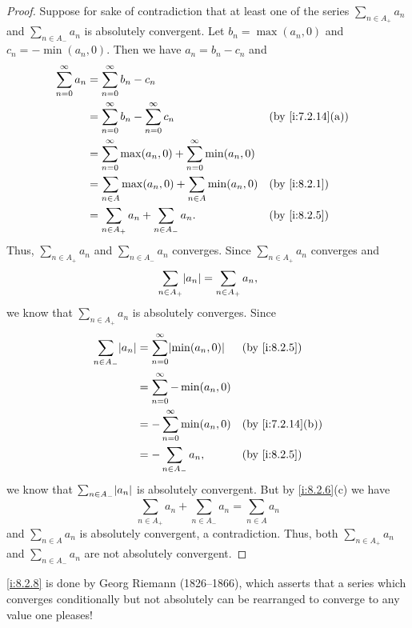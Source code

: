 \begin{proof}
  Suppose for sake of contradiction that at least one of the series \(\sum_{n \in A_+} a_n\) and \(\sum_{n \in A_-} a_n\) is absolutely convergent.
  Let \(b_n = \max(a_n, 0)\) and \(c_n = -\min(a_n, 0)\).
  Then we have \(a_n = b_n - c_n\) and
  \begin{align*}
    \sum_{n = 0}^\infty a_n & = \sum_{n = 0}^\infty b_n - c_n                                                             \\
                            & = \sum_{n = 0}^\infty b_n - \sum_{n = 0}^\infty c_n                   &  & \by{i:7.2.14}[a] \\
                            & = \sum_{n = 0}^\infty \max(a_n, 0) + \sum_{n = 0}^\infty \min(a_n, 0)                       \\
                            & = \sum_{n \in A} \max(a_n, 0) + \sum_{n \in A} \min(a_n, 0)           &  & \by{i:8.2.1}     \\
                            & = \sum_{n \in A_+} a_n + \sum_{n \in A_-} a_n.                        &  & \by{i:8.2.5}
  \end{align*}
  Thus, \(\sum_{n \in A_+} a_n\) and \(\sum_{n \in A_-} a_n\) converges.
  Since \(\sum_{n \in A_+} a_n\) converges and
  \[
    \sum_{n \in A_+} \abs{a_n} = \sum_{n \in A_+} a_n,
  \]
  we know that \(\sum_{n \in A_+} a_n\) is absolutely converges.
  Since
  \begin{align*}
    \sum_{n \in A_-} \abs{a_n} & = \sum_{n = 0}^\infty \abs{\min(a_n, 0)} &  & \by{i:8.2.5}     \\
                               & = \sum_{n = 0}^\infty -\min(a_n, 0)                            \\
                               & = -\sum_{n = 0}^\infty \min(a_n, 0)      &  & \by{i:7.2.14}[b] \\
                               & = -\sum_{n \in A_-} a_n,                 &  & \by{i:8.2.5}
  \end{align*}
  we know that \(\sum_{n \in A_-} \abs{a_n}\) is absolutely convergent.
  But by \cref{i:8.2.6}(c) we have
  \[
    \sum_{n \in A_+} a_n + \sum_{n \in A_-} a_n = \sum_{n \in A} a_n
  \]
  and \(\sum_{n \in A} a_n\) is absolutely convergent, a contradiction.
  Thus, both \(\sum_{n \in A_+} a_n\) and \(\sum_{n \in A_-} a_n\) are not absolutely convergent.
\end{proof}

\begin{note}
  \cref{i:8.2.8} is done by Georg Riemann (1826--1866), which asserts that a series which converges conditionally but not absolutely can be rearranged to converge to any value one pleases!
\end{note}

